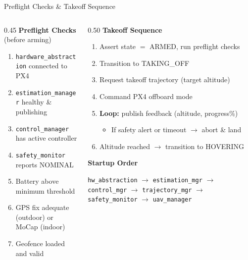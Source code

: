 \documentclass[aspectratio=169, 10pt]{beamer}
\begin{document}
\begin{frame}{Preflight Checks \& Takeoff Sequence}
\begin{columns}[T]
\begin{column}{0.45\textwidth}
\textbf{Preflight Checks} (before arming)
\begin{enumerate}\small
  \item \texttt{hardware\_abstraction} connected to PX4
  \item \texttt{estimation\_manager} healthy \& publishing
  \item \texttt{control\_manager} has active controller
  \item \texttt{safety\_monitor} reports NOMINAL
  \item Battery above minimum threshold
  \item GPS fix adequate (outdoor) or MoCap (indoor)
  \item Geofence loaded and valid
\end{enumerate}
\end{column}

\begin{column}{0.50\textwidth}
\textbf{Takeoff Sequence}

\vspace{0.3em}
\small
\begin{enumerate}
  \item Assert state $=$ ARMED, run preflight checks
  \item Transition to TAKING\_OFF
  \item Request takeoff trajectory (target altitude)
  \item Command PX4 offboard mode
  \item \textbf{Loop:} publish feedback (altitude, progress\%)
    \begin{itemize}\scriptsize
      \item If safety alert or timeout $\to$ abort \& land
    \end{itemize}
  \item Altitude reached $\to$ transition to HOVERING
\end{enumerate}

\vspace{0.5em}
\textbf{Startup Order}

\vspace{0.2em}
\scriptsize
\texttt{hw\_abstraction} $\to$ \texttt{estimation\_mgr} $\to$ \texttt{control\_mgr} $\to$ \texttt{trajectory\_mgr} $\to$ \texttt{safety\_monitor} $\to$ \texttt{uav\_manager}
\end{column}
\end{columns}
\end{frame}
\end{document}
